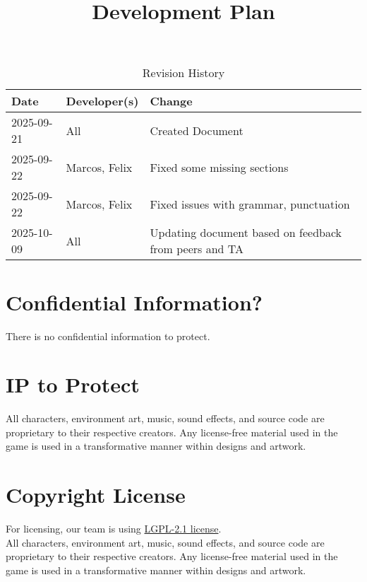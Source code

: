 \documentclass{article}
\title{Development Plan\\\progname}
\author{\authname}
\date{}
\begin{document}
\maketitle

\begin{table}[hp]
\caption{Revision History} \label{TblRevisionHistory}
\begin{tabularx}{\textwidth}{llX}
\toprule
\textbf{Date} & \textbf{Developer(s)} & \textbf{Change}\\
\midrule
2025-09-21 & All & Created Document\\
2025-09-22 & Marcos, Felix & Fixed some missing sections\\
2025-09-22 & Marcos, Felix & Fixed issues with grammar, punctuation\\
2025-10-09 & All & Updating document based on feedback from peers and TA\\
\bottomrule
\end{tabularx}
\end{table}

\newpage{}

\tableofcontents

\section{Confidential Information?}

There is no confidential information to protect.

\section{IP to Protect}

All characters, environment art, music, sound effects, and source code are proprietary to their respective creators. Any license-free material used in the game is used in a transformative manner within designs and artwork.\\

\section{Copyright License}

For licensing, our team is using \href{https://github.com/felix-hurst/Ad-Natura/blob/main/LICENSE}{LGPL-2.1 license}.\\

All characters, environment art, music, sound effects, and source code are proprietary to their respective creators. Any license-free material used in the game is used in a transformative manner within designs and artwork.\\
\end{document}
